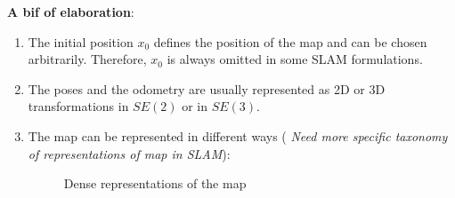 \textbf{A bif of elaboration}: 
\begin{enumerate}
    \item The initial position $x_0$ defines the position of the map and can be chosen arbitrarily. Therefore, $x_0$ is always omitted in some SLAM formulations.
    \item The poses and the odometry are usually represented as 2D or 3D transformations in $SE(2)$ or in $SE(3)$.
    \item The map can be represented in different ways ({\color{red} \emph{Need more specific taxonomy of representations of map in SLAM}}):

    \begin{figure}[htbp]
        \centering
        \hfill
        \hfill
        \caption{Dense representations of the map}
        \label{fig:map_dense_representations}
    \end{figure}
    \begin{itemize}

\end{itemize}
\end{enumerate}
